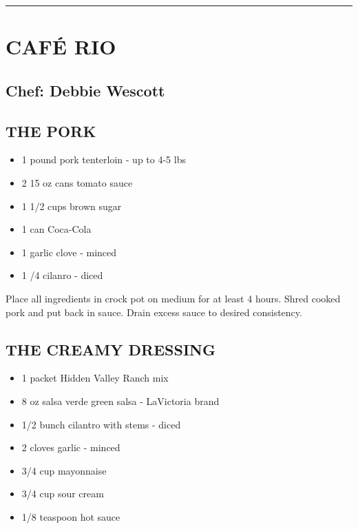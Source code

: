 \documentclass[
]{book}
\providecommand{\tightlist}{%
  \setlength{\itemsep}{0pt}\setlength{\parskip}{0pt}}
\begin{document}
\begin{center}\rule{0.5\linewidth}{0.5pt}\end{center}

\hypertarget{cafuxe9-rio}{%
\section*{CAFÉ RIO}\label{cafuxe9-rio}}


\hypertarget{chef-debbie-wescott-2}{%
\subsection*{Chef: Debbie Wescott}\label{chef-debbie-wescott-2}}


\hypertarget{the-pork}{%
\subsection*{THE PORK}\label{the-pork}}


\begin{itemize}
\tightlist
\item
  1 pound pork tenterloin - up to 4-5 lbs
\item
  2 15 oz cans tomato sauce
\item
  1 1/2 cups brown sugar
\item
  1 can Coca-Cola
\item
  1 garlic clove - minced
\item
  1 /4 cilanro - diced
\end{itemize}

Place all ingredients in crock pot on medium for at least 4 hours.
Shred cooked pork and put back in sauce.
Drain excess sauce to desired consistency.

\hypertarget{the-creamy-dressing}{%
\subsection*{THE CREAMY DRESSING}\label{the-creamy-dressing}}


\begin{itemize}
\tightlist
\item
  1 packet Hidden Valley Ranch mix
\item
  8 oz salsa verde green salsa - LaVictoria brand
\item
  1/2 bunch cilantro with stems - diced
\item
  2 cloves garlic - minced
\item
  3/4 cup mayonnaise
\item
  3/4 cup sour cream
\item
  1/8 teaspoon hot sauce
\end{itemize}
\end{document}
